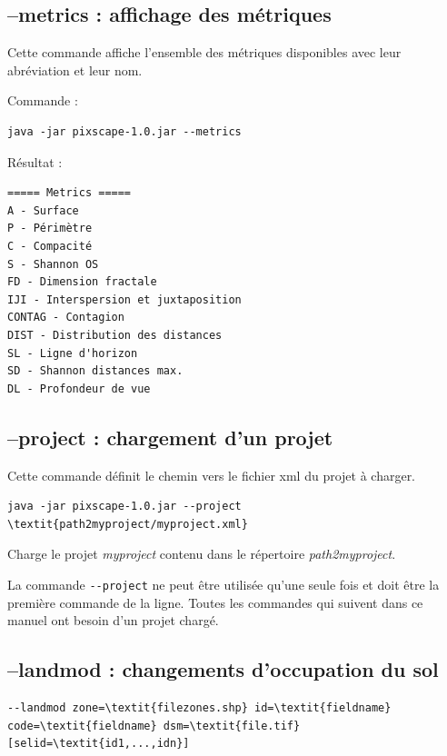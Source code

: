 \documentclass{report}
\begin{document}
\subsection{--metrics : affichage des métriques}
Cette commande affiche l'ensemble des métriques disponibles avec leur abréviation et leur nom. 

Commande :
\begin{Verbatim}
java -jar pixscape-1.0.jar --metrics
\end{Verbatim}
Résultat :
\begin{Verbatim}
===== Metrics =====
A - Surface
P - Périmètre
C - Compacité
S - Shannon OS
FD - Dimension fractale
IJI - Interspersion et juxtaposition
CONTAG - Contagion
DIST - Distribution des distances
SL - Ligne d'horizon
SD - Shannon distances max.
DL - Profondeur de vue
\end{Verbatim}

\subsection{--project : chargement d'un projet}
Cette commande définit le chemin vers le fichier xml du projet à charger.
\begin{Verbatim}[commandchars=\\\{\}]
java -jar pixscape-1.0.jar --project \textit{path2myproject/myproject.xml}
\end{Verbatim}
Charge le projet \textit{myproject} contenu dans le répertoire \textit{path2myproject}.

La commande \verb|--project| ne peut être utilisée qu'une seule fois et doit être la première commande de la ligne.
Toutes les commandes qui suivent dans ce manuel ont besoin d'un projet chargé.

\subsection{--landmod : changements d'occupation du sol}

\begin{Verbatim}[commandchars=\\\{\}]
--landmod zone=\textit{filezones.shp} id=\textit{fieldname} code=\textit{fieldname} dsm=\textit{file.tif} [selid=\textit{id1,...,idn}]
\end{Verbatim}
\end{document}

